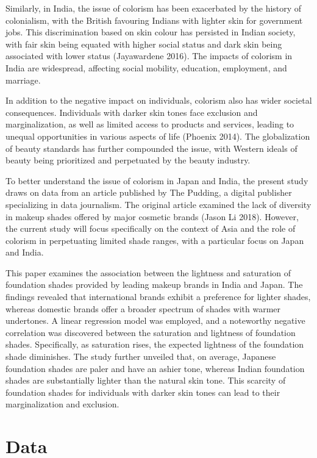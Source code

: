 \documentclass[
  letterpaper,
  DIV=11,
  numbers=noendperiod]{scrartcl}
\begin{document}
Similarly, in India, the issue of colorism has been exacerbated by the
history of colonialism, with the British favouring Indians with lighter
skin for government jobs. This discrimination based on skin colour has
persisted in Indian society, with fair skin being equated with higher
social status and dark skin being associated with lower status
(Jayawardene 2016). The impacts of colorism in India are widespread,
affecting social mobility, education, employment, and marriage.

In addition to the negative impact on individuals, colorism also has
wider societal consequences. Individuals with darker skin tones face
exclusion and marginalization, as well as limited access to products and
services, leading to unequal opportunities in various aspects of life
(Phoenix 2014). The globalization of beauty standards has further
compounded the issue, with Western ideals of beauty being prioritized
and perpetuated by the beauty industry.

To better understand the issue of colorism in Japan and India, the
present study draws on data from an article published by The Pudding, a
digital publisher specializing in data journalism. The original article
examined the lack of diversity in makeup shades offered by major
cosmetic brands (Jason Li 2018). However, the current study will focus
specifically on the context of Asia and the role of colorism in
perpetuating limited shade ranges, with a particular focus on Japan and
India.

This paper examines the association between the lightness and saturation
of foundation shades provided by leading makeup brands in India and
Japan. The findings revealed that international brands exhibit a
preference for lighter shades, whereas domestic brands offer a broader
spectrum of shades with warmer undertones. A linear regression model was
employed, and a noteworthy negative correlation was discovered between
the saturation and lightness of foundation shades. Specifically, as
saturation rises, the expected lightness of the foundation shade
diminishes. The study further unveiled that, on average, Japanese
foundation shades are paler and have an ashier tone, whereas Indian
foundation shades are substantially lighter than the natural skin tone.
This scarcity of foundation shades for individuals with darker skin
tones can lead to their marginalization and exclusion.

\newpage

\hypertarget{data}{%
\section{Data}\label{data}}
\end{document}
